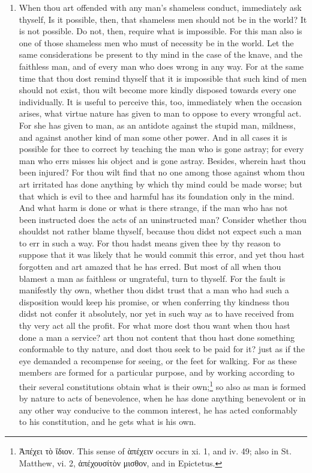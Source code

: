 \begin{enumerate}
\item When thou art offended with any man's shameless conduct, immediately ask thyself, Is it possible, then, that shameless men should not be in the world? It is not possible. Do not, then, require what is impossible. For this man also is one of those shameless men who must of necessity be in the world. Let the same considerations be present to thy mind in the case of the knave, and the faithless man, and of every man who does wrong in any way. For at the same time that thou dost remind thyself that it is impossible that such kind of men should not exist, thou wilt become more kindly disposed towards every one individually. It is useful to perceive this, too, immediately when the occasion arises, what virtue nature has given to man to oppose to every wrongful act. For she has given to man, as an antidote against the stupid man, mildness, and against another kind of man some other power. And in all cases it is possible for thee to correct by teaching the man who is gone astray; for every man who errs misses his object and is gone astray. Besides, wherein hast thou been injured? For thou wilt find that no one among those against whom thou art irritated has done anything by which thy mind could be made worse; but that which is evil to thee and harmful has its foundation only in the mind. And what harm is done or what is there strange, if the man who has not been instructed does the acts of an uninstructed man? Consider whether thou shouldst not rather blame thyself, because thou didst not expect such a man to err in such a way. For thou hadst means given thee by thy reason to suppose that it was likely that he would commit this error, and yet thou hast forgotten and art amazed that he has erred. But most of all when thou blamest a man as faithless or ungrateful, turn to thyself. For the fault is manifestly thy own, whether thou didst trust that a man who had such a disposition would keep his promise, or when conferring thy kindness thou didst not confer it absolutely, nor yet in such way as to have received from thy very act all the profit. For what more dost thou want when thou hast done a man a service? art thou not content that thou hast done something conformable to thy nature, and dost thou seek to be paid for it? just as if the eye demanded a recompense for seeing, or the feet for walking. For as these members are formed for a particular purpose, and by working according to their several constitutions obtain what is their own;\footnote{\textgreek{Ἀπέχει τὸ ἴδιον}. This sense of \textgreek{ὰπέχειν} occurs in xi. 1, and iv. 49; also in St. Matthew, vi. 2, \textgreek{ἀπέχουσίτὸν μισθον}, and in Epictetus.} so also as man is formed by nature to acts of benevolence, when he has done anything benevolent or in any other way conducive to the common interest, he has acted conformably to his constitution, and he gets what is his own.
\end{enumerate}